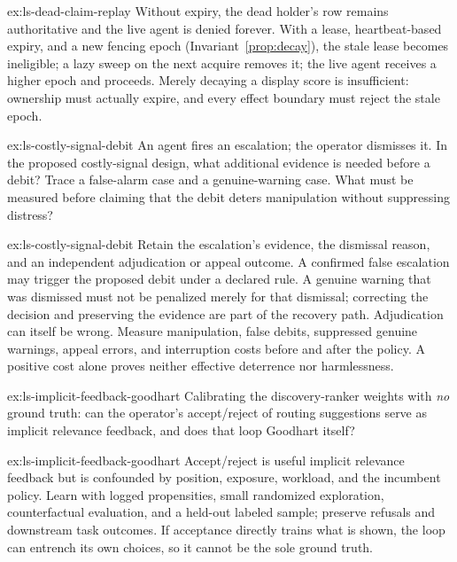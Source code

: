 \documentclass[11pt,a4paper]{article}
\theoremstyle{definition}
\theoremstyle{plain}
\begin{document}
\begin{pdsolution}{ex:ls-dead-claim-replay}
Without expiry, the dead holder's row remains authoritative and the live agent is denied forever. With a lease, heartbeat-based expiry, and a new fencing epoch (Invariant~\ref{prop:decay}), the stale lease becomes ineligible; a lazy sweep on the next acquire removes it; the live agent receives a higher epoch and proceeds. Merely decaying a display score is insufficient: ownership must actually expire, and every effect boundary must reject the stale epoch.
\end{pdsolution}
\begin{pdexercise}[kind=Trace,rating=2]{ex:ls-costly-signal-debit}
An agent fires an escalation; the operator dismisses it. In the proposed
costly-signal design, what additional evidence is needed before a debit?
Trace a false-alarm case and a genuine-warning case. What must be measured
before claiming that the debit deters manipulation without suppressing distress?
\end{pdexercise}
\begin{pdsolution}{ex:ls-costly-signal-debit}
Retain the escalation's evidence, the dismissal reason, and an independent
adjudication or appeal outcome. A confirmed false escalation may trigger the
proposed debit under a declared rule. A genuine warning that was dismissed
must not be penalized merely for that dismissal; correcting the decision and
preserving the evidence are part of the recovery path. Adjudication can itself
be wrong. Measure manipulation, false debits, suppressed genuine warnings,
appeal errors, and interruption costs before and after the policy. A positive
cost alone proves neither effective deterrence nor harmlessness.
\end{pdsolution}
\begin{pdexercise}[kind=Open,rating=3]{ex:ls-implicit-feedback-goodhart}
Calibrating the discovery-ranker weights with \emph{no} ground
truth: can the operator's accept/reject of routing suggestions serve as implicit
relevance feedback, and does that loop Goodhart itself?
\end{pdexercise}
\begin{pdsolution}{ex:ls-implicit-feedback-goodhart}
Accept/reject is useful implicit relevance feedback but is confounded by position, exposure, workload, and the incumbent policy. Learn with logged propensities, small randomized exploration, counterfactual evaluation, and a held-out labeled sample; preserve refusals and downstream task outcomes. If acceptance directly trains what is shown, the loop can entrench its own choices, so it cannot be the sole ground truth.
\end{pdsolution}
\end{document}
